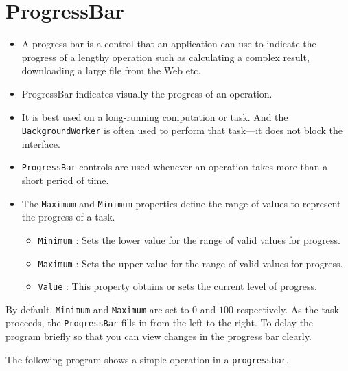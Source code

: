 \section{ProgressBar}
\begin{itemize}
	\item A progress bar is a control that an application can use to indicate the progress of a lengthy operation such as calculating a complex result, downloading a large file from the Web etc.
	\item ProgressBar indicates visually the progress of an operation. 
	\item It is best used on a long-running	computation or task. And the \texttt{BackgroundWorker} is often used to perform that task—it does not
	block the interface.
	\item \texttt{ProgressBar} controls are used whenever an operation takes more than a short period of time. 
	\item The \texttt{Maximum} and \texttt{Minimum} properties define the range of values to represent the progress of a task.
	\begin{itemize}
		\item \verb*|Minimum| : Sets the lower value for the range of valid values for progress.
		
		\item \verb*|Maximum| : Sets the upper value for the range of valid values for progress.
		
		\item \verb*|Value| : This property obtains or sets the current level of progress.
	\end{itemize}
\end{itemize}




By default, \texttt{Minimum} and \texttt{Maximum} are set to $ 0 $ and $ 100 $ respectively. As the task proceeds, the \texttt{ProgressBar} fills in from the left to the right. To delay the program briefly so that you can view changes in the progress bar clearly.

The following {\cs} program shows a simple operation in a \texttt{progressbar}.






